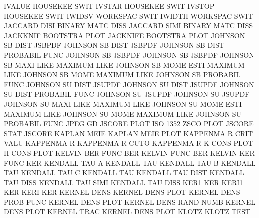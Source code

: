 IVALUE                                  HOUSEKEE SWIT
IVSTAR                                  HOUSEKEE SWIT
IVSTOP                                  HOUSEKEE SWIT
IWIDSV                                  WORKSPAC SWIT
IWIDTH                                  WORKSPAC SWIT
JACCARD  DISI                           BINARY   MATC DISS
JACCARD  SIMI                           BINARY   MATC DISS
JACKKNIF                                BOOTSTRA PLOT
JACKNIFE                                BOOTSTRA PLOT
JOHNSON  SB   DIST                      JSBPDF
JOHNSON  SB   DIST                      JSBPDF
JOHNSON  SB   DIST                      PROBABIL FUNC
JOHNSON  SB                             JSBPDF
JOHNSON  SB                             JSBPDF
JOHNSON  SB   MAXI LIKE                 MAXIMUM  LIKE
JOHNSON  SB   MOME ESTI                 MAXIMUM  LIKE
JOHNSON  SB   MOME                      MAXIMUM  LIKE
JOHNSON  SB                             PROBABIL FUNC
JOHNSON  SU   DIST                      JSUPDF
JOHNSON  SU   DIST                      JSUPDF
JOHNSON  SU   DIST                      PROBABIL FUNC
JOHNSON  SU                             JSUPDF
JOHNSON  SU                             JSUPDF
JOHNSON  SU   MAXI LIKE                 MAXIMUM  LIKE
JOHNSON  SU   MOME ESTI                 MAXIMUM  LIKE
JOHNSON  SU   MOME                      MAXIMUM  LIKE
JOHNSON  SU                             PROBABIL FUNC
JPEG                                    GD
JSCORE   PLOT                           ISO      1352 ZSCO PLOT
JSCORE   STAT                           JSCORE
KAPLAN   MEIE                           KAPLAN   MEIE PLOT
KAPPENMA R    CRIT VALU                 KAPPENMA R
KAPPENMA R    CUTO                      KAPPENMA R
K        CONS PLOT                      H        CONS PLOT
KELVIN   BER  FUNC                      BER
KELVIN   FUNC                           BER
KELVIN   KER  FUNC                      KER
KENDALL  TAU  A                         KENDALL  TAU
KENDALL  TAU  B                         KENDALL  TAU
KENDALL  TAU  C                         KENDALL  TAU
KENDALL  TAU  DIST                      KENDALL  TAU  DISS
KENDALL  TAU  SIMI                      KENDALL  TAU  DISS
KER1                                    KER
KERI1                                   KER
KERI                                    KER
KERNEL   DENS                           KERNEL   DENS PLOT
KERNEL   DENS PROB FUNC                 KERNEL   DENS PLOT
KERNEL   DENS RAND NUMB                 KERNEL   DENS PLOT
KERNEL   TRAC                           KERNEL   DENS PLOT
KLOTZ                                   KLOTZ    TEST
